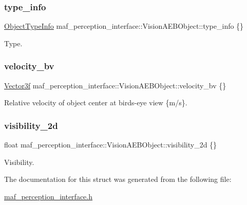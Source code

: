\subsubsection{\texorpdfstring{type\+\_\+info}{type\_info}}
{\footnotesize\ttfamily \hyperlink{structmaf__perception__interface_1_1ObjectTypeInfo}{Object\+Type\+Info} maf\+\_\+perception\+\_\+interface\+::\+Vision\+A\+E\+B\+Object\+::type\+\_\+info \{\}}



Type. 

\mbox{\label{structmaf__perception__interface_1_1VisionAEBObject_abdd5c78a5ee7c9fd4e639887a985a116}} 
\subsubsection{\texorpdfstring{velocity\+\_\+bv}{velocity\_bv}}
{\footnotesize\ttfamily \hyperlink{structmaf__perception__interface_1_1Vector3f}{Vector3f} maf\+\_\+perception\+\_\+interface\+::\+Vision\+A\+E\+B\+Object\+::velocity\+\_\+bv \{\}}



Relative velocity of object center at bird\textquotesingle{}s-\/eye view \{m/s\}. 

\mbox{\label{structmaf__perception__interface_1_1VisionAEBObject_a1476d909e4ca3b7a4766a2323a668fee}} 
\subsubsection{\texorpdfstring{visibility\+\_\+2d}{visibility\_2d}}
{\footnotesize\ttfamily float maf\+\_\+perception\+\_\+interface\+::\+Vision\+A\+E\+B\+Object\+::visibility\+\_\+2d \{\}}



Visibility. 



The documentation for this struct was generated from the following file\+:\begin{DoxyCompactItemize}
\item 
\hyperlink{maf__perception__interface_8h}{maf\+\_\+perception\+\_\+interface.\+h}\end{DoxyCompactItemize}
